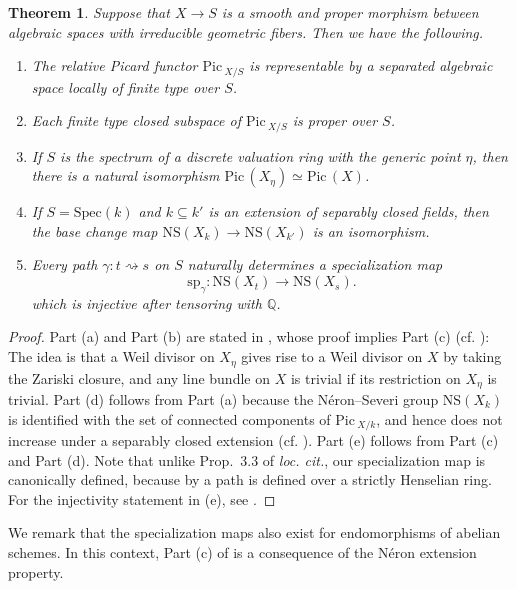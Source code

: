 \documentclass[11pt, letterpaper]{amsart}
\theoremstyle{plain}
\newtheorem{theorem}{Theorem}[section]
\theoremstyle{definition}
\newcommand{\IQ}{\mathbb{Q}}
\newcommand{\Spec}{\mathrm{Spec}}
\newcommand{\<}{\langle}
\renewcommand{\>}{\rangle}
\newcommand{\Pic}{\mathrm{Pic}\,}
\newcommand{\NS}{\mathrm{NS}}
\begin{document}
\begin{theorem}
\label{thm: specialization of line bundle}
    Suppose that $X \to S$ is a smooth and proper morphism between algebraic spaces with irreducible geometric fibers. Then we have the following. 
    \begin{enumerate}[label=\upshape{(\alph*)}]
        \item The relative Picard functor $\Pic_{X/S}$ is representable by a separated algebraic space locally of finite type over $S$. 
        \item Each finite type closed subspace of $\Pic_{X/S}$ is proper over $S$. 
        \item If $S$ is the spectrum of a discrete valuation ring with the generic point $\eta$, then there is a natural isomorphism $\Pic(X_\eta) \simeq \Pic(X)$. 
        \item If $S = \Spec(k)$ and $k \subseteq k'$ is an extension of separably closed fields, then the base change map $\NS(X_k) \to \NS(X_{k'})$ is an isomorphism. 
        \item Every path $\gamma : t \rightsquigarrow s$ on $S$ naturally determines a specialization map 
        \[
        \mathrm{sp}_\gamma  : \NS(X_t) \to \NS(X_s). 
        \] 
        which is injective after tensoring with $\IQ$.
    \end{enumerate}
\end{theorem}
\begin{proof}
    Part (a) and Part (b) are stated in \cite[\S8.3, Thm.~3]{BLR}, whose proof implies Part (c) (cf. \cite[Eqn.(3.4)]{MPJumping}):
    The idea is that a Weil divisor on $X_\eta$ gives rise to a Weil divisor on $X$ by taking the Zariski closure, and any line bundle on $X$ is trivial if its restriction on $X_\eta$ is trivial. 
    Part (d) follows from Part (a) because the N\'eron--Severi group $\NS(X_k)$ is identified with the set of connected components of $\Pic_{X/k}$, and hence does not increase under a separably closed extension (cf. \cite[Prop.~3.1]{MPJumping}). 
    Part (e) follows from Part (c) and Part (d). 
    Note that unlike Prop.~3.3 of \textit{loc. cit.}, our specialization map is canonically defined, because by  a path is defined over a strictly Henselian ring. 
    For the injectivity statement in (e), see \cite[Prop.~3.6]{MPJumping}.
\end{proof}

We remark that the specialization maps also exist for endomorphisms of abelian schemes. In this context, Part (c) of  is a consequence of the N\'eron extension property. 
\end{document}
